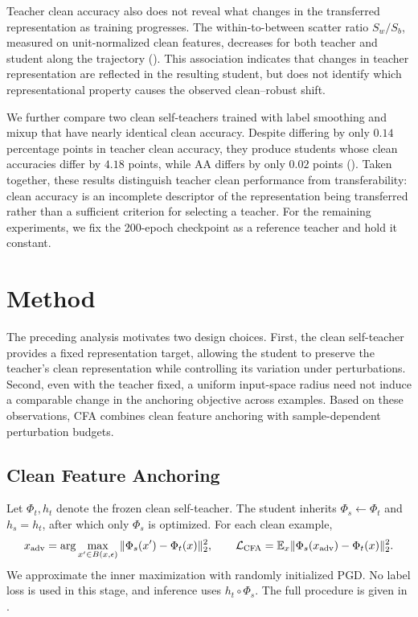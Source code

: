 \documentclass{article} %
\theoremstyle{plain}
\begin{document}
Teacher clean accuracy also does not reveal what changes in the transferred
representation as training progresses. The within-to-between scatter ratio
\(S_w/S_b\), measured on unit-normalized clean features, decreases for both
teacher and student along the trajectory (). This
association indicates that changes in teacher representation are reflected in
the resulting student, but does not identify which representational property
causes the observed clean--robust shift.

We further compare two clean self-teachers trained with label smoothing and
mixup that have nearly identical clean accuracy. Despite differing by only
\(0.14\) percentage points in teacher clean accuracy, they produce students
whose clean accuracies differ by \(4.18\) points, while AA differs by only
\(0.02\) points (). Taken together, these results
distinguish teacher clean performance from transferability: clean accuracy is
an incomplete descriptor of the representation being transferred rather than
a sufficient criterion for selecting a teacher. For the remaining
experiments, we fix the 200-epoch checkpoint as a reference teacher and hold
it constant.

\section{Method}
\label{sec:method}

The preceding analysis motivates two design choices. First, the clean
self-teacher provides a fixed representation target, allowing the student to
preserve the teacher's clean representation while controlling its variation
under perturbations. Second, even with the teacher fixed, a uniform
input-space radius need not induce a comparable change in the anchoring
objective across examples. Based on these observations, CFA combines clean
feature anchoring with sample-dependent perturbation budgets.

\subsection{Clean Feature Anchoring}
\label{sec:anchor}
Let \(\Phi_t,h_t\) denote the frozen clean self-teacher. The student inherits
\(\Phi_s\leftarrow\Phi_t\) and \(h_s=h_t\), after which only \(\Phi_s\) is
optimized. For each clean example,
\begin{equation}
 x_{\rm adv}=\arg\max_{x'\in B(x,\epsilon)}
 \|\Phi_s(x')-\Phi_t(x)\|_2^2,\qquad
 \mathcal L_{\rm CFA}=\mathbb E_x\|\Phi_s(x_{\rm adv})-\Phi_t(x)\|_2^2.
\label{eqn:anchor}
\end{equation}
We approximate the inner maximization with randomly initialized PGD. No label
loss is used in this stage, and inference uses \(h_t\circ\Phi_s\). The full
procedure is given in .
\end{document}
